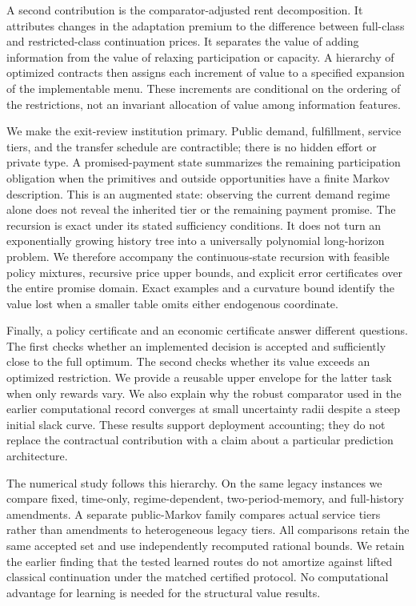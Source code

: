\documentclass[11pt,letterpaper]{article}
\theoremstyle{definition}\newtheorem{assumption}[theorem]{Assumption}
\begin{document}
A second contribution is the comparator-adjusted rent decomposition. It attributes changes in the adaptation premium to the difference between full-class and restricted-class continuation prices. It separates the value of adding information from the value of relaxing participation or capacity. A hierarchy of optimized contracts then assigns each increment of value to a specified expansion of the implementable menu. These increments are conditional on the ordering of the restrictions, not an invariant allocation of value among information features.

We make the exit-review institution primary. Public demand, fulfillment, service tiers, and the transfer schedule are contractible; there is no hidden effort or private type. A promised-payment state summarizes the remaining participation obligation when the primitives and outside opportunities have a finite Markov description. This is an augmented state: observing the current demand regime alone does not reveal the inherited tier or the remaining payment promise. The recursion is exact under its stated sufficiency conditions. It does not turn an exponentially growing history tree into a universally polynomial long-horizon problem. We therefore accompany the continuous-state recursion with feasible policy mixtures, recursive price upper bounds, and explicit error certificates over the entire promise domain. Exact examples and a curvature bound identify the value lost when a smaller table omits either endogenous coordinate.

Finally, a policy certificate and an economic certificate answer different questions. The first checks whether an implemented decision is accepted and sufficiently close to the full optimum. The second checks whether its value exceeds an optimized restriction. We provide a reusable upper envelope for the latter task when only rewards vary. We also explain why the robust comparator used in the earlier computational record converges at small uncertainty radii despite a steep initial slack curve. These results support deployment accounting; they do not replace the contractual contribution with a claim about a particular prediction architecture.

The numerical study follows this hierarchy. On the same legacy instances we compare fixed, time-only, regime-dependent, two-period-memory, and full-history amendments. A separate public-Markov family compares actual service tiers rather than amendments to heterogeneous legacy tiers. All comparisons retain the same accepted set and use independently recomputed rational bounds. We retain the earlier finding that the tested learned routes do not amortize against lifted classical continuation under the matched certified protocol. No computational advantage for learning is needed for the structural value results.
\end{document}
